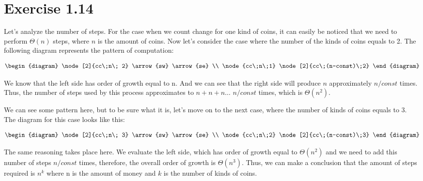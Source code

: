 \section*{Exercise 1.14}

Let's analyze the number of steps. For the case when we count change for one kind of coins, it can easily be noticed that we need to perform $\Theta(n)$ steps, where $n$ is the amount of coins. Now let's consider the case where the number of the kinds of coins equals to 2. The following diagram represents the pattern of computation:

\[
	\begin{diagram}
		\node[2]{cc\;n\; 2} \arrow{sw}
		\arrow{se}
		\\
		\node{cc\;n\;1} \node[2]{cc\;(n-const)\;2}
	\end{diagram}
\]

We know that the left side has order of growth equal to n. And we can see that the right side will produce $n$ approximately $n/const$ times. Thus, the number of steps used by this process approximates to $n+n+n\dots$ $n/const$ times, which is $\Theta(n^2)$.

We can see some pattern here, but to be sure what it is, let's move on to the next case, where the number of kinds of coins equals to $3$. The diagram for this case looks like this:

\[
	\begin{diagram}
		\node[2]{cc\;n\; 3} \arrow{sw}
		\arrow{se}
		\\
		\node{cc\;n\;2} \node[2]{cc\;(n-const)\;3}
	\end{diagram}
\]

The same reasoning takes place here. We evaluate the left side, which has order of growth equal to $\Theta(n^2)$ and we need to add this number of steps $n/const$ times, therefore, the overall order of growth is $\Theta(n^3)$. Thus, we can make a conclusion that the amount of steps required is $n^k$ where n is the amount of money and $k$ is the number of kinds of coins.
